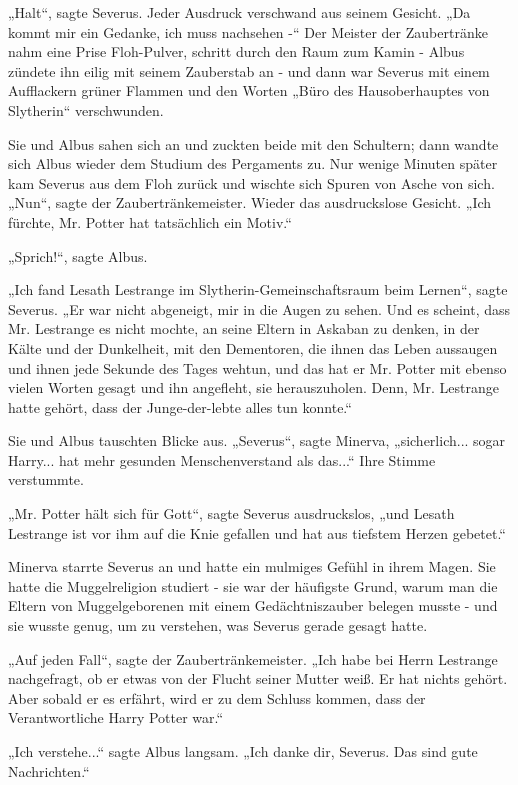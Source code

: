 {„Halt“, sagte Severus. Jeder Ausdruck verschwand aus seinem Gesicht. „Da kommt mir ein Gedanke, ich muss nachsehen -“ Der Meister der Zaubertränke nahm eine Prise Floh-Pulver, schritt durch den Raum zum Kamin - Albus zündete ihn eilig mit seinem Zauberstab an - und dann war Severus mit einem Aufflackern grüner Flammen und den Worten „Büro des Hausoberhauptes von Slytherin“ verschwunden.

Sie und Albus sahen sich an und zuckten beide mit den Schultern; dann wandte sich Albus wieder dem Studium des Pergaments zu. Nur wenige Minuten später kam Severus aus dem Floh zurück und wischte sich Spuren von Asche von sich. „Nun“, sagte der Zaubertränkemeister. Wieder das ausdruckslose Gesicht. „Ich fürchte, Mr. Potter hat tatsächlich ein Motiv.“

„Sprich!“, sagte Albus.

„Ich fand Lesath Lestrange im Slytherin-Gemeinschaftsraum beim Lernen“, sagte Severus. „Er war nicht abgeneigt, mir in die Augen zu sehen. Und es scheint, dass Mr. Lestrange es nicht mochte, an seine Eltern in Askaban zu denken, in der Kälte und der Dunkelheit, mit den Dementoren, die ihnen das Leben aussaugen und ihnen jede Sekunde des Tages wehtun, und das hat er Mr. Potter mit ebenso vielen Worten gesagt und ihn angefleht, sie herauszuholen. Denn, Mr. Lestrange hatte gehört, dass der Junge-der-lebte alles tun konnte.“

Sie und Albus tauschten Blicke aus. „Severus“, sagte Minerva, „sicherlich... sogar Harry... hat mehr gesunden Menschenverstand als das...“ Ihre Stimme verstummte.

„Mr. Potter hält sich für Gott“, sagte Severus ausdruckslos, „und Lesath Lestrange ist vor ihm auf die Knie gefallen und hat aus tiefstem Herzen gebetet.“

Minerva starrte Severus an und hatte ein mulmiges Gefühl in ihrem Magen. Sie hatte die Muggelreligion studiert - sie war der häufigste Grund, warum man die Eltern von Muggelgeborenen mit einem Gedächtniszauber belegen musste - und sie wusste genug, um zu verstehen, was Severus gerade gesagt hatte.

„Auf jeden Fall“, sagte der Zaubertränkemeister. „Ich habe bei Herrn Lestrange nachgefragt, ob er etwas von der Flucht seiner Mutter weiß. Er hat nichts gehört. Aber sobald er es erfährt, wird er zu dem Schluss kommen, dass der Verantwortliche Harry Potter war.“

„Ich verstehe...“ sagte Albus langsam. „Ich danke dir, Severus. Das sind gute Nachrichten.“

}
